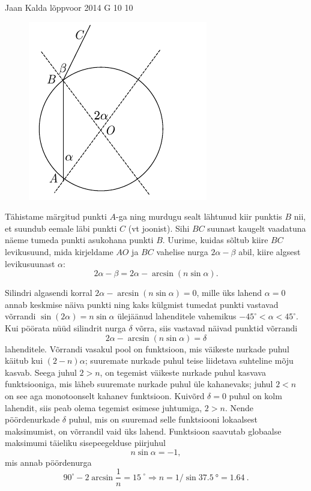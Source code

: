 \documentclass[11pt, twoside]{article}
\begin{document}
{%
{Jaan Kalda} %
{lõppvoor} %
{2014} %
{G 10} %
{10} %
{

\ifSolution
\begin{figure}%
\includegraphics[trim = 0mm 0mm 12mm 0mm, clip, width=1\linewidth]{2014-v3g-10-silinder}
\end{figure}

Tähistame märgitud punkti $A$-ga ning murdugu sealt lähtunud kiir punktis $B$ nii, et suundub eemale läbi punkti $C$ (vt joonist).
Sihi $BC$ suunast kaugelt vaadatuna näeme tumeda punkti asukohana punkti $B$. Uurime, kuidas sõltub kiire $BC$ levikusuund, mida kirjeldame 
$AO$ ja $BC$ vahelise nurga $2\alpha-\beta$ abil, kiire algsest levikusuunast $\alpha$:
$$2\alpha-\beta= 2\alpha-\arcsin (n\sin\alpha).$$

Silindri algasendi korral $2\alpha-\arcsin (n\sin\alpha) =0$, mille üks lahend $\alpha=0$ annab keskmise näiva punkti
ning kaks külgmist tumedat punkti vastavad võrrandi $\sin(2\alpha)=n\sin\alpha$ ülejäänud lahenditele vahemikus $-45^\circ <\alpha<45^\circ$.
Kui pöörata nüüd silindrit nurga $\delta$ võrra, siis vastavad näivad punktid võrrandi 
$$2\alpha-\arcsin (n\sin\alpha) =\delta$$
lahenditele. Võrrandi vasakul pool on funktsioon, mis väikeste nurkade puhul käitub kui $(2-n)\alpha$; suuremate nurkade puhul teise liidetava suhteline mõju kasvab.
Seega juhul $2>n$, on tegemist väikeste nurkade puhul kasvava funktsiooniga, mis läheb suuremate nurkade puhul üle kahanevaks;
juhul $2<n$ on see aga monotoonselt kahanev funktsioon. Kuivõrd $\delta=0$ puhul on kolm lahendit, siis peab olema tegemist esimese juhtumiga, $2>n$.
Nende pöördenurkade $\delta$ puhul, mis on suuremad selle funktsiooni lokaalsest maksimumist, on võrrandil vaid üks lahend.
Funktsioon saavutab globaalse maksimumi täieliku sisepeegelduse piirjuhul 
$$n\sin\alpha=-1,$$
mis annab pöördenurga
$$90^\circ-2\arcsin \frac 1n=\SI{15}{}^\circ\Rightarrow n=1/\sin \SI{37,5}{\degree} = \SI{1,64}{}.$$
\fi
}

}
\end{document}
